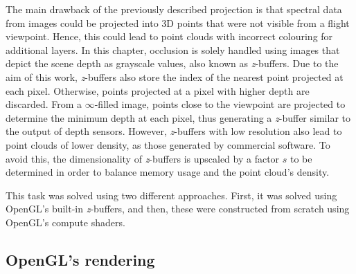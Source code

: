 The main drawback of the previously described projection is that spectral data from images could be projected into 3D points that were not visible from a flight viewpoint. Hence, this could lead to point clouds with incorrect colouring for additional layers. In this chapter, occlusion is solely handled using images that depict the scene depth as grayscale values, also known as \textit{z}-buffers. Due to the aim of this work, \textit{z}-buffers also store the index of the nearest point projected at each pixel. Otherwise, points projected at a pixel with higher depth are discarded.  From a $\infty$-filled image, points close to the viewpoint are projected to determine the minimum depth at each pixel, thus generating a \textit{z}-buffer similar to the output of depth sensors. However, \textit{z}-buffers with low resolution also lead to point clouds of lower density, as those generated by commercial software. To avoid this, the dimensionality of \textit{z}-buffers is upscaled by a factor $s$ to be determined in order to balance memory usage and the point cloud's density.

This task was solved using two different approaches. First, it was solved using OpenGL's built-in \textit{z}-buffers, and then, these were constructed from scratch using OpenGL's compute shaders.

\newcommand{\Points}{\textrm{P}\textsubscript{GPU}}
\newcommand{\Viewpoints}{\textrm{V}\textsubscript{CPU}}
\newcommand{\Space}{\hspace{1mm}}
\newcommand{\Zbuffer}{z\textrm{-buffer}\textsubscript{GPU}}
\newcommand{\ZbufferCPU}{z\textrm{-buffer}\textsubscript{CPU}}
\newcommand{\Indices}{\textrm{indices}\textsubscript{GPU}}
\newcommand{\Codes}{\textrm{codes}\textsubscript{GPU}}
\newcommand{\PCCardinality}{|\Points|}
\newcommand{\LeftPoints}{\textrm{n}_\textsubscript{left}}
\newcommand{\CurrentPoints}{\textrm{n}_\textsubscript{current}}
\newcommand{\MaxPoints}{\textrm{n}_\textsubscript{max}}
\newcommand{\NumGroups}{\textrm{n}_\textsubscript{groups}}
\newcommand{\Pointa}{\textrm{p}\textsubscript{3D}}
\newcommand{\Pointb}{\textrm{p}\textsubscript{2D}}

\subsection{OpenGL's rendering}

